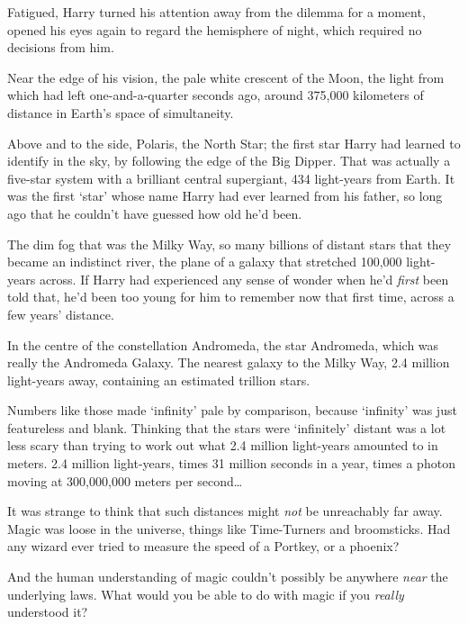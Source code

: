Fatigued, Harry turned his attention away from the dilemma for a moment, opened his eyes again to regard the hemisphere of night, which required no decisions from him.

Near the edge of his vision, the pale white crescent of the Moon, the light from which had left one-and-a-quarter seconds ago, around 375,000 kilometers of distance in Earth's space of simultaneity.

Above and to the side, Polaris, the North Star; the first star Harry had learned to identify in the sky, by following the edge of the Big Dipper. That was actually a five-star system with a brilliant central supergiant, 434 light-years from Earth. It was the first `star' whose name Harry had ever learned from his father, so long ago that he couldn't have guessed how old he'd been.

The dim fog that was the Milky Way, so many billions of distant stars that they became an indistinct river, the plane of a galaxy that stretched 100,000 light-years across. If Harry had experienced any sense of wonder when he'd \emph{first} been told that, he'd been too young for him to remember now that first time, across a few years' distance.

In the centre of the constellation Andromeda, the star Andromeda, which was really the Andromeda Galaxy. The nearest galaxy to the Milky Way, 2.4 million light-years away, containing an estimated trillion stars.

Numbers like those made `infinity' pale by comparison, because `infinity' was just featureless and blank. Thinking that the stars were `infinitely' distant was a lot less scary than trying to work out what 2.4 million light-years amounted to in meters. 2.4 million light-years, times 31 million seconds in a year, times a photon moving at 300,000,000 meters per second{\ldots}

It was strange to think that such distances might \emph{not} be unreachably far away. Magic was loose in the universe, things like Time-Turners and broomsticks. Had any wizard ever tried to measure the speed of a Portkey, or a phoenix?

And the human understanding of magic couldn't possibly be anywhere \emph{near} the underlying laws. What would you be able to do with magic if you \emph{really} understood it?

